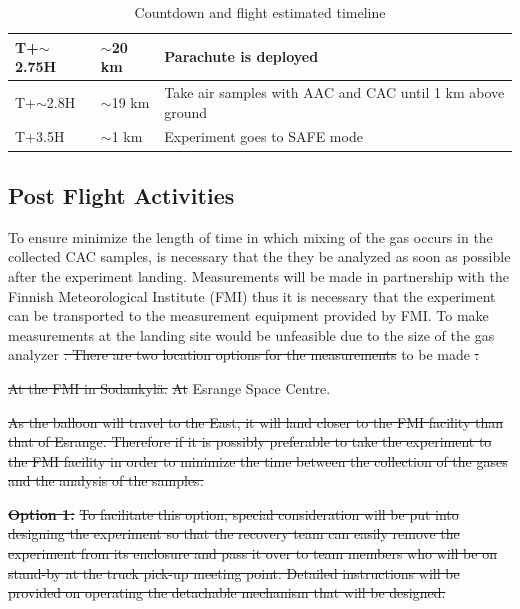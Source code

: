 \documentclass[a4paper,12pt,twoside]{article}
\providecommand{\DIFaddtex}[1]{{\protect\color{blue}\uwave{#1}}} %
\providecommand{\DIFdeltex}[1]{{\protect\color{red}\sout{#1}}}                      %
\providecommand{\DIFaddbegin}{} %
\providecommand{\DIFaddend}{} %
\providecommand{\DIFdelbegin}{} %
\providecommand{\DIFdelend}{} %
\providecommand{\DIFadd}[1]{\texorpdfstring{\DIFaddtex{#1}}{#1}} %
\providecommand{\DIFdel}[1]{\texorpdfstring{\DIFdeltex{#1}}{}} %
\newcommand{\DIFscaledelfig}{0.5}
\newlength{\DIFdelgraphicswidth} %
\newlength{\DIFdelgraphicsheight} %
\newcommand{\DIFaddincludegraphics}[2][]{{\color{blue}\fbox{\DIFOincludegraphics[#1]{#2}}}} %
\newcommand{\DIFdelincludegraphics}[2][]{%
\sbox{\DIFdelgraphicsbox}{\DIFOincludegraphics[#1]{#2}}%
\settoboxwidth{\DIFdelgraphicswidth}{\DIFdelgraphicsbox} %
\settoboxtotalheight{\DIFdelgraphicsheight}{\DIFdelgraphicsbox} %
\scalebox{\DIFscaledelfig}{%
\parbox[b]{\DIFdelgraphicswidth}{\usebox{\DIFdelgraphicsbox}\\[-\baselineskip] \rule{\DIFdelgraphicswidth}{0em}}\llap{\resizebox{\DIFdelgraphicswidth}{\DIFdelgraphicsheight}{%
\setlength{\unitlength}{\DIFdelgraphicswidth}%
\begin{picture}(1,1)%
\thicklines\linethickness{2pt} %
{\color[rgb]{1,0,0}\put(0,0){\framebox(1,1){}}}%
{\color[rgb]{1,0,0}\put(0,0){\line( 1,1){1}}}%
{\color[rgb]{1,0,0}\put(0,1){\line(1,-1){1}}}%
\end{picture}%
}\hspace*{3pt}}} %
} %
\DeclareRobustCommand{\DIFaddbegin}{\DIFOaddbegin \let\includegraphics\DIFaddincludegraphics} %
\DeclareRobustCommand{\DIFaddend}{\DIFOaddend \let\includegraphics\DIFOincludegraphics} %
\DeclareRobustCommand{\DIFdelbegin}{\DIFOdelbegin \let\includegraphics\DIFdelincludegraphics} %
\DeclareRobustCommand{\DIFdelend}{\DIFOaddend \let\includegraphics\DIFOincludegraphics} %
\begin{document}
\begin{table}[H]
\begin{tabular}{|l|l|l|}
T+$\sim$2.75H                    & $\sim$20 km                        & Parachute is deployed                                    \\ \hline
T+$\sim$2.8H                     & $\sim$19 km                        & Take air samples with AAC and CAC until 1 km above ground                 \\ \hline
T+3.5H                           & $\sim$1 km                         & Experiment goes to SAFE mode                             \\ \hline
\end{tabular}
\caption{Countdown and flight estimated timeline}
\label{tab:countflight}
\end{table}
\raggedbottom
\pagebreak
\subsection{Post Flight Activities}

To ensure minimize the length of time in which mixing of the gas occurs in the collected CAC samples, is necessary that the they  be analyzed as soon as possible after the experiment landing. Measurements will be made in partnership with the Finnish Meteorological Institute (FMI) thus it is necessary that the experiment can be transported to the measurement equipment provided by FMI. To make measurements at the landing site would be unfeasible due to the size of the gas analyzer \DIFdelbegin \DIFdel{. There are two location options for the measurements }\DIFdelend \DIFaddbegin \DIFadd{hence measurements are }\DIFaddend to be made \DIFdelbegin \DIFdel{:
}%

\DIFdel{At the FMI in Sodankylä.
    }%
\DIFdel{At }\DIFdelend \DIFaddbegin \DIFadd{at the }\DIFaddend Esrange Space Centre.
\DIFdelbegin %
\DIFdelend 

\DIFdelbegin \DIFdel{As the balloon will travel to the East, it will land closer to the FMI facility than that of Esrange. Therefore if it is possibly preferable to take the experiment to the FMI facility in order to minimize the time between the collection of the gases and the analysis of the samples. 
}%

\textbf{\DIFdel{Option 1:}}
\DIFdel{To facilitate this option, special consideration will be put into designing the experiment so that the recovery team can easily remove the experiment from its enclosure and pass it over to team members who will be on stand-by at the truck pick-up meeting point. Detailed instructions will be provided on operating the detachable mechanism that will be designed. 
}%
\end{document}
